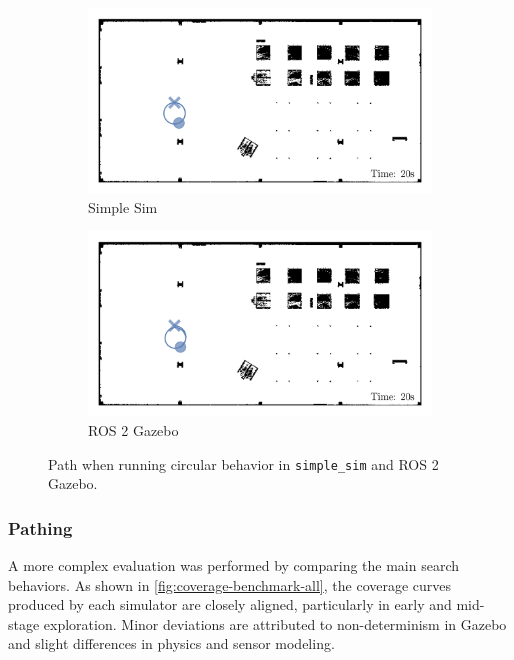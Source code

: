 \begin{figure}[H]
  \centering
  \begin{subfigure}[b]{0.45\textwidth}
    \centering
    \includegraphics[width=\textwidth]{./figures/plots/consistency/simple-sim-paths-(after-20s).png}
    \caption{Simple Sim}
  \end{subfigure}
  \begin{subfigure}[b]{0.45\textwidth}
    \centering
    \includegraphics[width=\textwidth]{./figures/plots/consistency/ros-2-paths-(after-20s).png}
    \caption{ROS 2 Gazebo}
  \end{subfigure}
  \caption{Path when running circular behavior in \texttt{simple\_sim} and ROS 2 Gazebo.}
  \label{fig:movement-consistency}
\end{figure}

\subsubsection{Pathing}
A more complex evaluation was performed by comparing the main search behaviors. 
As shown in \cref{fig:coverage-benchmark-all}, the coverage curves produced by each simulator are closely aligned, particularly in early and mid-stage exploration. 
Minor deviations are attributed to non-determinism in Gazebo and slight differences in physics and sensor modeling.

